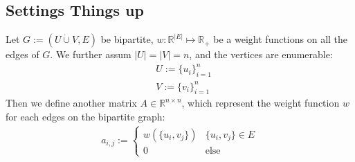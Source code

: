 \documentclass[]{article}
\theoremstyle{definition}
\begin{document}
    \subsection{Settings Things up}
        Let $G:= (U\dot\cup V, E)$ be bipartite, $w:\mathbb R^{|E|} \mapsto \mathbb R_+$ be a weight functions on all the edges of $G$. We further assum $|U|=|V| = n$, and the vertices are enumerable: 
        \begin{align}
            & U:= \{u_i\}_{i = 1}^n 
            \\
            & V:= \{v_i\}_{i= 1}^n 
        \end{align}
        Then we define another matrix $A\in \mathbb R^{n\times n}$, which represent the weight function $w$ for each edges on the bipartite graph: 
        \begin{align}
            a_{i, j} := \begin{cases}
                w(\{u_i, v_j\}) & \{u_i, v_j\} \in E
                \\
                0 & \text{else}
            \end{cases}
        \end{align}
\end{document}
